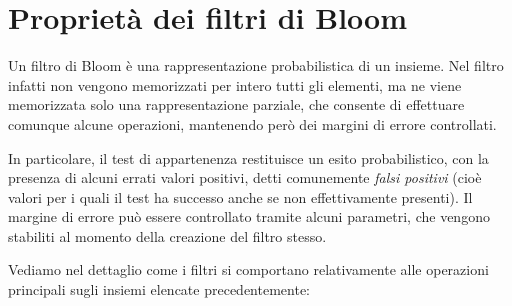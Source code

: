 \section{Proprietà dei filtri di Bloom}

Un filtro di Bloom \cite{bloomfilters} è una rappresentazione probabilistica di un insieme. Nel
filtro infatti non vengono memorizzati per intero tutti gli elementi, ma ne viene memorizzata solo
una rappresentazione parziale, che consente di effettuare comunque alcune operazioni, mantenendo
però dei margini di errore controllati.

In particolare, il test di appartenenza restituisce un esito probabilistico, con la presenza di
alcuni errati valori positivi, detti comunemente \emph{falsi positivi} (cioè valori per i quali
il test ha successo anche se non effettivamente presenti). Il margine di errore può essere
controllato tramite alcuni parametri, che vengono stabiliti al momento della creazione del filtro
stesso.

Vediamo nel dettaglio come i filtri si comportano relativamente alle operazioni principali sugli
insiemi elencate precedentemente:

